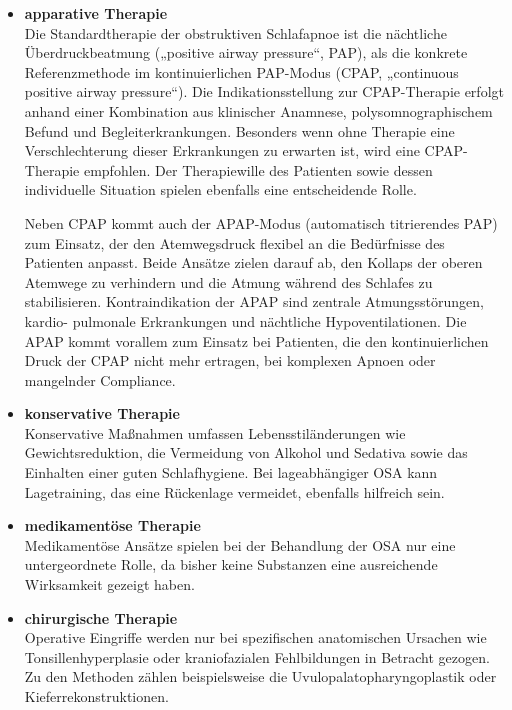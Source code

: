\documentclass[a4paper, 12pt]{article}
\begin{document}
\begin{itemize}
    \item \textbf{apparative Therapie}\\
    Die Standardtherapie der obstruktiven Schlafapnoe ist die nächtliche Überdruckbeatmung („positive airway pressure“, PAP), als die konkrete Referenzmethode im kontinuierlichen PAP-Modus (CPAP, „continuous positive airway pressure“). Die Indikationsstellung zur CPAP-Therapie erfolgt anhand einer Kombination aus klinischer Anamnese, polysomnographischem Befund und Begleiterkrankungen. Besonders wenn ohne Therapie eine Verschlechterung dieser Erkrankungen zu erwarten ist, wird eine CPAP-Therapie empfohlen. Der Therapiewille des Patienten sowie dessen individuelle Situation spielen ebenfalls eine entscheidende Rolle.
    
    Neben CPAP kommt auch der APAP-Modus (automatisch titrierendes PAP) zum Einsatz, der den Atemwegsdruck flexibel an die Bedürfnisse des Patienten anpasst. Beide Ansätze zielen darauf ab, den Kollaps der oberen Atemwege zu verhindern und die Atmung während des Schlafes zu stabilisieren. Kontraindikation der APAP sind zentrale Atmungsstörungen, kardio- pulmonale Erkrankungen und nächtliche Hypoventilationen. Die APAP kommt vorallem zum Einsatz bei Patienten, die den kontinuierlichen Druck der CPAP nicht mehr ertragen, bei komplexen Apnoen oder mangelnder Compliance. 

    \item \textbf{konservative Therapie}\\
    Konservative Maßnahmen umfassen Lebensstiländerungen wie Gewichtsreduktion, die Vermeidung von Alkohol und Sedativa sowie das Einhalten einer guten Schlafhygiene. Bei lageabhängiger OSA kann Lagetraining, das eine Rückenlage vermeidet, ebenfalls hilfreich sein.

    \item \textbf{medikamentöse Therapie}\\
    Medikamentöse Ansätze spielen bei der Behandlung der OSA nur eine untergeordnete Rolle, da bisher keine Substanzen eine ausreichende Wirksamkeit gezeigt haben.

    \item \textbf{chirurgische Therapie}\\
    Operative Eingriffe werden nur bei spezifischen anatomischen Ursachen wie Tonsillenhyperplasie oder kraniofazialen Fehlbildungen in Betracht gezogen. Zu den Methoden zählen beispielsweise die Uvulopalatopharyngoplastik oder Kieferrekonstruktionen. 
    

\end{itemize}
\end{document}
